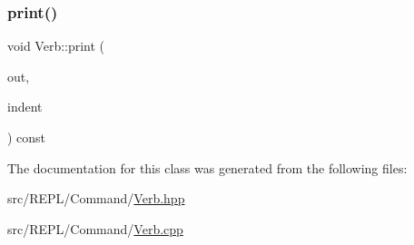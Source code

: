 \mbox{\label{classxd_1_1repl_1_1cmd_1_1_verb_ad7ccfcaf2e157956c376ac7407c83483}} 
\subsubsection{\texorpdfstring{print()}{print()}}
{\footnotesize\ttfamily void Verb\+::print (\begin{DoxyParamCaption}\item[{std\+::ostream \&}]{out,  }\item[{\mbox{\hyperlink{classxd_1_1util_1_1_indent_helper}{xd\+::util\+::\+Indent\+Helper}} \&}]{indent }\end{DoxyParamCaption}) const}



The documentation for this class was generated from the following files\+:\begin{DoxyCompactItemize}
\item 
src/\+R\+E\+P\+L/\+Command/\mbox{\hyperlink{_verb_8hpp}{Verb.\+hpp}}\item 
src/\+R\+E\+P\+L/\+Command/\mbox{\hyperlink{_verb_8cpp}{Verb.\+cpp}}\end{DoxyCompactItemize}
